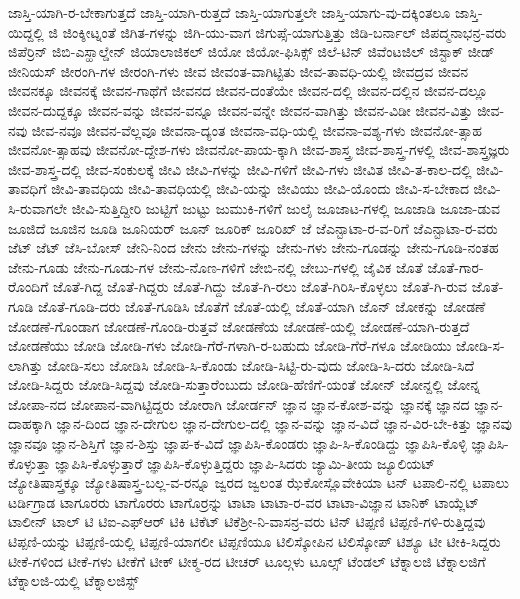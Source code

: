{ಜಾಸ್ತಿ-ಯಾಗಿ-ರ-ಬೇಕಾಗುತ್ತದೆ
ಜಾಸ್ತಿ-ಯಾಗಿ-ರುತ್ತದೆ
ಜಾಸ್ತಿ-ಯಾಗುತ್ತಲೇ
ಜಾಸ್ತಿ-ಯಾಗು-ವು-ದಕ್ಕಿಂತಲೂ
ಜಾಸ್ತಿ-ಯಿದ್ದಲ್ಲಿ
ಜಿ
ಜಿಂಕ್ಶೀಟ್ನಂತೆ
ಜಿಗಿತ-ಗಳನ್ನು
ಜಿಗಿ-ಯು-ವಾಗ
ಜಿಗುಪ್ಸೆ-ಯಾಗುತ್ತಿತ್ತು
ಜಿಡಿ-ಬರ್ನಾಲ್
ಜಿಪದ್ಮನಾಭನ್ರ-ವರು
ಜಿಪೆರ್ರಿನ್
ಜಿಬಿ-ಎಸ್ಹಾಲ್ಡೇನ್
ಜಿಯಾಲಾಜಿಕಲ್
ಜಿಯೋ
ಜಿಯೋ-ಫಿಸಿಕ್ಸ್
ಜಿಲೆ-ಟಿನ್
ಜಿವೆಂಟಜಿಲ್
ಜಿಸ್ಟಾಕ್
ಜೀಡ್
ಜೀನಿಯಸ್
ಜೀರಂಗಿ-ಗಳ
ಜೀರಂಗಿ-ಗಳು
ಜೀವ
ಜೀವಂತ-ವಾಗಿಟ್ಟಿತು
ಜೀವ-ತಾವಧಿ-ಯಲ್ಲಿ
ಜೀವದ್ರವ
ಜೀವನ
ಜೀವನಕ್ಕೂ
ಜೀವನಕ್ಕೆ
ಜೀವನ-ಗಾಥೆಗೆ
ಜೀವನದ
ಜೀವನ-ದಂತೆಯೇ
ಜೀವನ-ದಲ್ಲಿ
ಜೀವನ-ದಲ್ಲಿನ
ಜೀವನ-ದಲ್ಲೂ
ಜೀವನ-ದುದ್ದಕ್ಕೂ
ಜೀವನ-ವನ್ನು
ಜೀವನ-ವನ್ನೂ
ಜೀವನ-ವನ್ನೇ
ಜೀವನ-ವಾಗಿತ್ತು
ಜೀವನ-ವಿಡೀ
ಜೀವನ-ವಿತ್ತು
ಜೀವ-ನವು
ಜೀವ-ನವೂ
ಜೀವನ-ವೆಲ್ಲವೂ
ಜೀವನಾ-ದ್ಯಂತ
ಜೀವನಾ-ವಧಿ-ಯಲ್ಲಿ
ಜೀವನಾ-ವಶ್ಯ-ಗಳು
ಜೀವನೋ-ತ್ಸಾಹ
ಜೀವನೋ-ತ್ಸಾಹವು
ಜೀವನೋ-ದ್ದೇಶ-ಗಳು
ಜೀವನೋ-ಪಾಯ-ಕ್ಕಾಗಿ
ಜೀವ-ಶಾಸ್ತ್ರ
ಜೀವ-ಶಾಸ್ತ್ರ-ಗಳಲ್ಲಿ
ಜೀವ-ಶಾಸ್ತ್ರಜ್ಞರು
ಜೀವ-ಶಾಸ್ತ್ರ-ದಲ್ಲಿ
ಜೀವ-ಸಂಕುಲಕ್ಕೆ
ಜೀವಿ
ಜೀವಿ-ಗಳನ್ನು
ಜೀವಿ-ಗಳಿಗೆ
ಜೀವಿ-ಗಳು
ಜೀವಿತ
ಜೀವಿ-ತ-ಕಾಲ-ದಲ್ಲಿ
ಜೀವಿ-ತಾವಧಿಗೆ
ಜೀವಿ-ತಾವಧಿಯ
ಜೀವಿ-ತಾವಧಿಯಲ್ಲಿ
ಜೀವಿ-ಯನ್ನು
ಜೀವಿಯು
ಜೀವಿ-ಯೊಂದು
ಜೀವಿ-ಸ-ಬೇಕಾದ
ಜೀವಿ-ಸಿ-ರುವಾಗಲೇ
ಜೀವಿ-ಸುತ್ತಿದ್ದೀರಿ
ಜುಟ್ಟಿಗೆ
ಜುಟ್ಟು
ಜುಮುಕಿ-ಗಳಿಗೆ
ಜುಲೈ
ಜೂಜಾಟ-ಗಳಲ್ಲಿ
ಜೂಜಾಡಿ
ಜೂಜಾ-ಡುವ
ಜೂಜಿದೆ
ಜೂಜಿನ
ಜೂಡಿ
ಜೂನಿಯರ್
ಜೂನ್
ಜೂರಿಕ್
ಜೂರಿಖ್
ಜೆ
ಜೆಎನ್ಟಾಟಾ-ರ-ವ-ರಿಗೆ
ಜೆಎನ್ಟಾಟಾ-ರ-ವರು
ಜೆಟ್
ಜೆಟ್
ಜೆಸಿ-ಬೋಸ್
ಜೇನಿ-ನಿಂದ
ಜೇನು
ಜೇನು-ಗಳನ್ನು
ಜೇನು-ಗಳು
ಜೇನು-ಗೂಡನ್ನು
ಜೇನು-ಗೂಡಿ-ನಂತಹ
ಜೇನು-ಗೂಡು
ಜೇನು-ಗೂಡು-ಗಳ
ಜೇನು-ನೊಣ-ಗಳಿಗೆ
ಜೇಬಿ-ನಲ್ಲಿ
ಜೇಬು-ಗಳಲ್ಲಿ
ಜೈವಿಕ
ಜೊತೆ
ಜೊತೆ-ಗಾರ-ರೊಂದಿಗೆ
ಜೊತೆ-ಗಿದ್ದ
ಜೊತೆ-ಗಿದ್ದರು
ಜೊತೆ-ಗಿದ್ದು
ಜೊತೆ-ಗಿ-ರಲು
ಜೊತೆ-ಗಿರಿಸಿ-ಕೊಳ್ಳಲು
ಜೊತೆ-ಗಿ-ರುವ
ಜೊತೆ-ಗೂಡಿ
ಜೊತೆ-ಗೂಡಿ-ದರು
ಜೊತೆ-ಗೂಡಿಸಿ
ಜೊತೆಗೆ
ಜೊತೆ-ಯಲ್ಲಿ
ಜೊತೆ-ಯಾಗಿ
ಜೊನ್
ಜೋಕನ್ನು
ಜೋಡಣೆ
ಜೋಡಣೆ-ಗೊಂಡಾಗ
ಜೋಡಣೆ-ಗೊಂಡಿ-ರುತ್ತವೆ
ಜೋಡಣೆಯ
ಜೋಡಣೆ-ಯಲ್ಲಿ
ಜೋಡಣೆ-ಯಾಗಿ-ರುತ್ತದೆ
ಜೋಡಣೆಯು
ಜೋಡಿ
ಜೋಡಿ-ಗಳು
ಜೋಡಿ-ಗೆರೆ-ಗಳಾಗಿ-ರ-ಬಹುದು
ಜೋಡಿ-ಗೆರೆ-ಗಳೂ
ಜೋಡಿಯು
ಜೋಡಿ-ಸ-ಲಾಗಿತ್ತು
ಜೋಡಿ-ಸಲು
ಜೋಡಿಸಿ
ಜೋಡಿ-ಸಿ-ಕೊಂಡು
ಜೋಡಿ-ಸಿಟ್ಟಿ-ರು-ವುದು
ಜೋಡಿ-ಸಿ-ದರು
ಜೋಡಿ-ಸಿದೆ
ಜೋಡಿ-ಸಿದ್ದರು
ಜೋಡಿ-ಸಿದ್ದವು
ಜೋಡಿ-ಸುತ್ತಾರೆಂಬುದು
ಜೋಡಿ-ಹೆಣಿಗೆ-ಯಂತೆ
ಜೋನ್
ಜೋನ್ದಲ್ಲಿ
ಜೋನ್ನ
ಜೋಪಾ-ನದ
ಜೋಪಾನ-ವಾಗಿಟ್ಟಿದ್ದರು
ಜೋರಾಗಿ
ಜೋರ್ಡನ್
ಜ್ಞಾನ
ಜ್ಞಾನ-ಕೋಶ-ವನ್ನು
ಜ್ಞಾನಕ್ಕೆ
ಜ್ಞಾನದ
ಜ್ಞಾನ-ದಾಹಕ್ಕಾಗಿ
ಜ್ಞಾನ-ದಿಂದ
ಜ್ಞಾನ-ದೇಗುಲ
ಜ್ಞಾನ-ದೇಗುಲ-ದಲ್ಲಿ
ಜ್ಞಾನ-ವನ್ನು
ಜ್ಞಾನ-ವಿದೆ
ಜ್ಞಾನ-ವಿರ-ಬೇ-ಕಿತ್ತು
ಜ್ಞಾನವು
ಜ್ಞಾನವೂ
ಜ್ಞಾನ-ಶಿಸ್ತಿಗೆ
ಜ್ಞಾನ-ಶಿಸ್ತು
ಜ್ಞಾಪ-ಕ-ವಿದೆ
ಜ್ಞಾಪಿಸಿ-ಕೊಂಡರು
ಜ್ಞಾಪಿ-ಸಿ-ಕೊಂಡಿದ್ದು
ಜ್ಞಾಪಿಸಿ-ಕೊಳ್ಳಿ
ಜ್ಞಾಪಿಸಿ-ಕೊಳ್ಳುತ್ತಾ
ಜ್ಞಾಪಿಸಿ-ಕೊಳ್ಳುತ್ತಾರೆ
ಜ್ಞಾಪಿಸಿ-ಕೊಳ್ಳುತ್ತಿದ್ದರು
ಜ್ಞಾಪಿ-ಸಿದರು
ಜ್ಯಾಮಿ-ತೀಯ
ಜ್ಯೂಲಿಯಟ್
ಜ್ಯೋತಿಷಾಸ್ತ್ರಕ್ಕೂ
ಜ್ಯೋತಿಷಾಸ್ತ್ರ-ಬಲ್ಲ-ವ-ರನ್ನೂ
ಜ್ವರದ
ಜ್ವಲಂತ
ಝೆಕೋಸ್ಲೊವೇಕಿಯಾ
ಟನ್
ಟಪಾಲಿ-ನಲ್ಲಿ
ಟಪಾಲು
ಟರ್ಡಿಗ್ರಾಡ
ಟಾಗೂರರು
ಟಾಗೊರರು
ಟಾಗೊರ್ರನ್ನು
ಟಾಟಾ
ಟಾಟಾ-ರ-ವರ
ಟಾಟಾ-ವಿಜ್ಞಾನ
ಟಾನಿಕ್
ಟಾಯ್ಲೆಟ್
ಟಾಲೀನ್
ಟಾಲ್
ಟಿ
ಟಿಐ-ಎಫ್ಆರ್
ಟಿಕಿ
ಟಿಕೆಟ್
ಟಿಕೆಶ್ರೀ-ನಿ-ವಾಸನ್ರ-ವರು
ಟಿನ್
ಟಿಪ್ಪಣಿ
ಟಿಪ್ಪಣಿ-ಗಳಿ-ರುತ್ತಿದ್ದವು
ಟಿಪ್ಪಣಿ-ಯನ್ನು
ಟಿಪ್ಪಣಿ-ಯಲ್ಲಿ
ಟಿಪ್ಪಣಿ-ಯಾಗಲೀ
ಟಿಪ್ಪಣಿಯೂ
ಟಿಲಿಸ್ಕೋಪಿನ
ಟಿಲಿಸ್ಕೋಪ್
ಟಿಶ್ಯೂ
ಟೀ
ಟೀಕಿ-ಸಿದ್ದರು
ಟೀಕೆ-ಗಳಿಂದ
ಟೀಕೆ-ಗಳು
ಟೀಕೆಗೆ
ಟೀಕ್
ಟೀಕ್ಮ-ರದ
ಟೀಚರ್
ಟೂಲ್ಗಳು
ಟೂಲ್ಸ್
ಟೆಂಡಲ್
ಟೆಕ್ನಾಲಜಿ
ಟೆಕ್ನಾಲಜಿಗೆ
ಟೆಕ್ನಾಲಜಿ-ಯಲ್ಲಿ
ಟೆಕ್ನಾಲಜಿಸ್ಟ್
}
